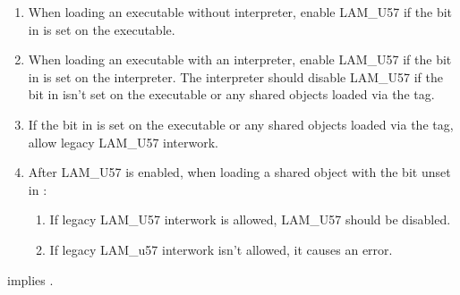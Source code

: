 \begin{enumerate}
  \item
    \begin{sloppypar}
      When loading an executable without interpreter, enable LAM_U57
      if the  bit in
        is set on the executable.
    \end{sloppypar}
  \item
    \begin{sloppypar}
      When loading an executable with an interpreter, enable LAM_U57
      if the  bit in
       is set on the
      interpreter.  The interpreter should disable LAM_U57 if the
       bit in
       isn't set on the
      executable or any shared objects loaded via the 
      tag.
    \end{sloppypar}
   \item If the  bit in
      is set on the
     executable or any shared objects loaded via the
      tag, allow legacy LAM_U57 interwork.
  \item
    \begin{sloppypar}
      After LAM_U57 is enabled, when loading a shared object with the
       bit unset in
      :
      \begin{enumerate}
	\item If legacy LAM_U57 interwork is allowed, LAM_U57 should be
	  disabled.
	\item If legacy LAM_u57 interwork isn't allowed, it causes an
	  error.
      \end{enumerate}
    \end{sloppypar}
\end{enumerate}

 implies
.

